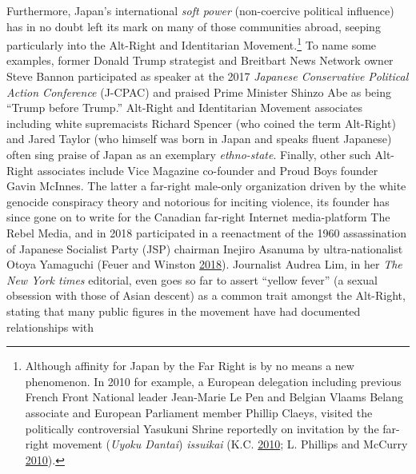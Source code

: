 \documentclass[10pt,british,A4paper,,openany]{memoir}
\begin{document}
Furthermore, Japan's international \emph{soft power} (non-coercive
political influence) has in no doubt left its mark on many of those
communities abroad, seeping particularly into the Alt-Right and
Identitarian Movement.\footnote{Although affinity for Japan by the Far
  Right is by no means a new phenomenon. In 2010 for example, a European
  delegation including previous French Front National leader Jean-Marie
  Le Pen and Belgian Vlaams Belang associate and European Parliament
  member Phillip Claeys, visited the politically controversial Yasukuni
  Shrine reportedly on invitation by the far-right movement (\emph{Uyoku
  Dantai}) \emph{issuikai} (K.C.
  \protect\hyperlink{ref-k.c._how_2010}{2010}; L. Phillips and McCurry
  \protect\hyperlink{ref-phillips_bnp_2010}{2010}).} To name some
examples, former Donald Trump strategist and Breitbart News Network
owner Steve Bannon participated as speaker at the 2017 \emph{Japanese
Conservative Political Action Conference} (J-CPAC) and praised Prime
Minister Shinzo Abe as being ``Trump before Trump.'' Alt-Right and
Identitarian Movement associates including white supremacists Richard
Spencer (who coined the term Alt-Right) and Jared Taylor (who himself
was born in Japan and speaks fluent Japanese) often sing praise of Japan
as an exemplary \emph{ethno-state}. Finally, other such Alt-Right
associates include Vice Magazine co-founder and Proud Boys founder Gavin
McInnes. The latter a far-right male-only organization driven by the
white genocide conspiracy theory and notorious for inciting violence,
its founder has since gone on to write for the Canadian far-right
Internet media-platform The Rebel Media, and in 2018 participated in a
reenactment of the 1960 assassination of Japanese Socialist Party (JSP)
chairman Inejiro Asanuma by ultra-nationalist Otoya Yamaguchi (Feuer and
Winston \protect\hyperlink{ref-feuer_founder_2018}{2018}). Journalist
Audrea Lim, in her \emph{The New York times} editorial, even goes so far
to assert ``yellow fever'' (a sexual obsession with those of Asian
descent) as a common trait amongst the Alt-Right, stating that many
public figures in the movement have had documented relationships with
\end{document}
